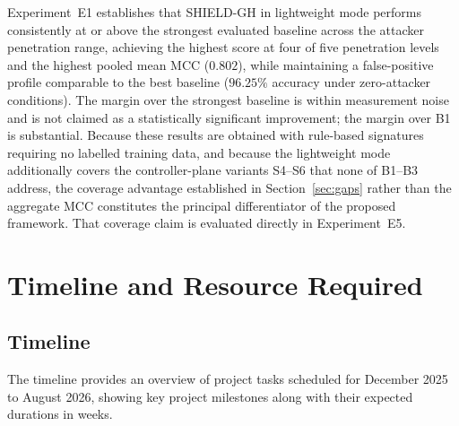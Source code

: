 \documentclass[12pt, a4paper]{report}
\begin{document}
Experiment~E1 establishes that SHIELD-GH in lightweight mode performs
consistently at or above the strongest evaluated baseline across the
attacker penetration range, achieving the highest score at four of five
penetration levels and the highest pooled mean MCC ($0.802$), while
maintaining a false-positive profile comparable to the best baseline
($96.25\%$ accuracy under zero-attacker conditions). The margin over the
strongest baseline is within measurement noise and is not claimed as a
statistically significant improvement; the margin over B1 is
substantial. Because these results are obtained with rule-based
signatures requiring no labelled training data, and because the
lightweight mode additionally covers the controller-plane variants
S4--S6 that none of B1--B3 address, the coverage advantage established
in Section~\ref{sec:gaps} rather than the aggregate MCC constitutes the
principal differentiator of the proposed framework. That coverage claim
is evaluated directly in Experiment~E5.

\chapter{Timeline and Resource Required}

\section{Timeline}

The timeline provides an overview of project tasks scheduled for December 2025 to August 2026, showing key project milestones along with their expected durations in weeks.
\end{document}
